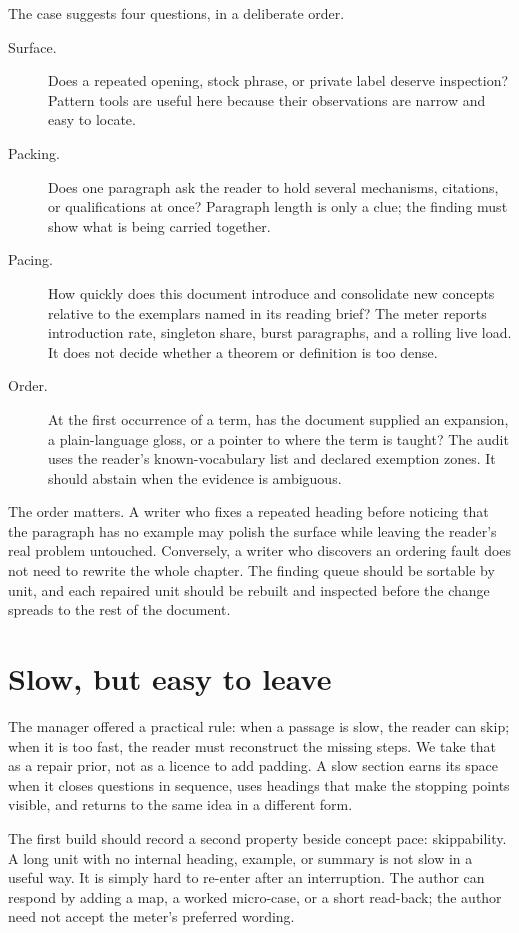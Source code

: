 The case suggests four questions, in a deliberate order.

\begin{description}
\item[Surface.] Does a repeated opening, stock phrase, or private label
  deserve inspection? Pattern tools are useful here because their observations
  are narrow and easy to locate.
\item[Packing.] Does one paragraph ask the reader to hold several mechanisms,
  citations, or qualifications at once? Paragraph length is only a clue; the
  finding must show what is being carried together.
\item[Pacing.] How quickly does this document introduce and consolidate new
  concepts relative to the exemplars named in its reading brief? The meter
  reports introduction rate, singleton share, burst paragraphs, and a rolling
  live load. It does not decide whether a theorem or definition is too dense.
\item[Order.] At the first occurrence of a term, has the document supplied an
  expansion, a plain-language gloss, or a pointer to where the term is taught?
  The audit uses the reader's known-vocabulary list and declared exemption
  zones. It should abstain when the evidence is ambiguous.
\end{description}

The order matters. A writer who fixes a repeated heading before noticing that
the paragraph has no example may polish the surface while leaving the reader's
real problem untouched. Conversely, a writer who discovers an ordering fault
does not need to rewrite the whole chapter. The finding queue should be
sortable by unit, and each repaired unit should be rebuilt and inspected before
the change spreads to the rest of the document.

\section{Slow, but easy to leave}
\label{sec:hpo-skippable}

The manager offered a practical rule: when a passage is slow, the reader can
skip; when it is too fast, the reader must reconstruct the missing steps. We
take that as a repair prior, not as a licence to add padding. A slow section
earns its space when it closes questions in sequence, uses headings that make
the stopping points visible, and returns to the same idea in a different form.

The first build should record a second property beside concept pace:
skippability. A long unit with no internal heading, example, or summary is not
slow in a useful way. It is simply hard to re-enter after an interruption. The
author can respond by adding a map, a worked micro-case, or a short read-back;
the author need not accept the meter's preferred wording.

